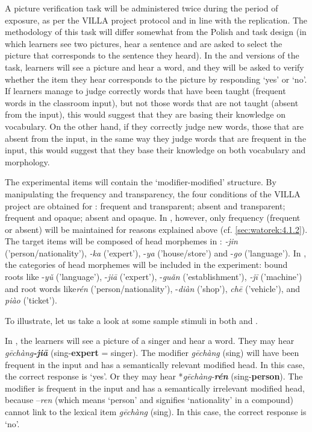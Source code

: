 \documentclass[output=paper,colorlinks,citecolor=brown,modfonts,nonflat]{../langscibook}
\begin{document}
A picture verification task will be administered twice during the period of exposure, as per the VILLA project protocol and in line with the  replication. The methodology of this task will differ somewhat from the Polish and  task design (in which learners see two pictures, hear a sentence and are asked to select the picture that corresponds to the sentence they heard). In the  and  versions of the task, learners will see a picture and hear a word, and they will be asked to verify whether the item they hear corresponds to the picture by responding ‘yes’ or ‘no’. If learners manage to judge correctly words that have been taught (frequent words in the classroom input), but not those words that are not taught (absent from the input), this would suggest that they are basing their knowledge on vocabulary. On the other hand, if they correctly judge new words, those that are absent from the input, in the same way they judge words that are frequent in the input, this would suggest that they base their knowledge on both vocabulary and morphology.

The experimental items will contain the ‘modifier-modified’ structure. By manipulating the frequency and transparency, the four conditions of the VILLA project are obtained for : frequent and transparent; absent and transparent; frequent and opaque; absent and opaque. In , however, only frequency (frequent or absent) will be maintained for reasons explained above (cf. \ref{sec:watorek:4.1.2}). The target items will be composed of head morphemes in : \textit{{}-jin} ('person/nationality'), \textit{{}-ka} ('expert'), -\textit{ya} ('house/store') and -\textit{go} ('language'). In , the categories of head morphemes will be included in the experiment: bound roots like {}-\textit{yǔ} ('language'), -\textit{jiā} ('expert'), -\textit{guǎn} ('establishment'), \textit{{}-jī} ('machine') and root words like\textit{rén} ('person/nationality'), -\textit{diàn} ('shop'), \textit{chē} ('vehicle'), and \textit{piào} ('ticket').

To illustrate, let us take a look at some sample stimuli in both  and .

In , the learners will see a picture of a singer and hear a word. They may hear \textit{gēchàng}\textbf{\textit{{}-jiā}} (sing-\textbf{expert} = singer). The modifier \textit{gēchàng} (sing) will have been frequent in the input and has a semantically relevant modified head. In this case, the correct response is ‘yes’. Or they may hear *\textit{gēchàng-}\textbf{\textit{rén}} (sing-\textbf{person}). The modifier is frequent in the input and has a semantically irrelevant modified head, because –\textit{ren} (which means ‘person’ and signifies ‘nationality’ in a compound) cannot link to the lexical item \textit{gēchàng} (sing). In this case, the correct response is ‘no’.
\end{document}
